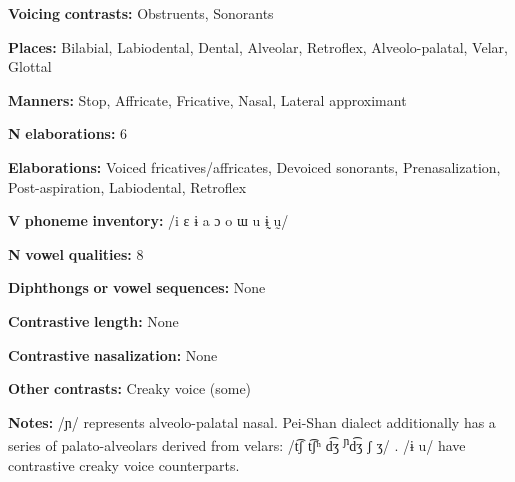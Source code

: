 \begin{styleBody}
\textbf{Voicing} \textbf{contrasts:} Obstruents, Sonorants
\end{styleBody}

\begin{styleBody}
\textbf{Places:} Bilabial, Labiodental, Dental, Alveolar, Retroflex, Alveolo-palatal, Velar, Glottal
\end{styleBody}

\begin{styleBody}
\textbf{Manners:} Stop, Affricate, Fricative, Nasal, Lateral approximant
\end{styleBody}

\begin{styleBody}
\textbf{N} \textbf{elaborations:} 6
\end{styleBody}

\begin{styleBody}
\textbf{Elaborations:} Voiced fricatives/affricates, Devoiced sonorants, Prenasalization, Post-aspiration, Labiodental, Retroflex
\end{styleBody}

\begin{styleBody}
\textbf{V} \textbf{phoneme} \textbf{inventory:} /i ɛ ɨ a ɔ o ɯ u ɨ̰ ṵ/
\end{styleBody}

\begin{styleBody}
\textbf{N} \textbf{vowel} \textbf{qualities:} 8
\end{styleBody}

\begin{styleBody}
\textbf{Diphthongs} \textbf{or} \textbf{vowel} \textbf{sequences:} None
\end{styleBody}

\begin{styleBody}
\textbf{Contrastive} \textbf{length:} None
\end{styleBody}

\begin{styleBody}
\textbf{Contrastive} \textbf{nasalization:} None
\end{styleBody}

\begin{styleBody}
\textbf{Other} \textbf{contrasts:} Creaky voice (some)
\end{styleBody}

\begin{styleBody}
\textbf{Notes:} /ɲ/ represents alveolo-palatal nasal. Pei-Shan dialect additionally has a series of palato-alveolars derived from velars: /t͡ʃ t͡ʃʰ d͡ʒ \textsuperscript{ɲ}d͡ʒ ʃ ʒ/ \citep[68-9]{Maoji1997}. /ɨ u/ have contrastive creaky voice counterparts.
\end{styleBody}

